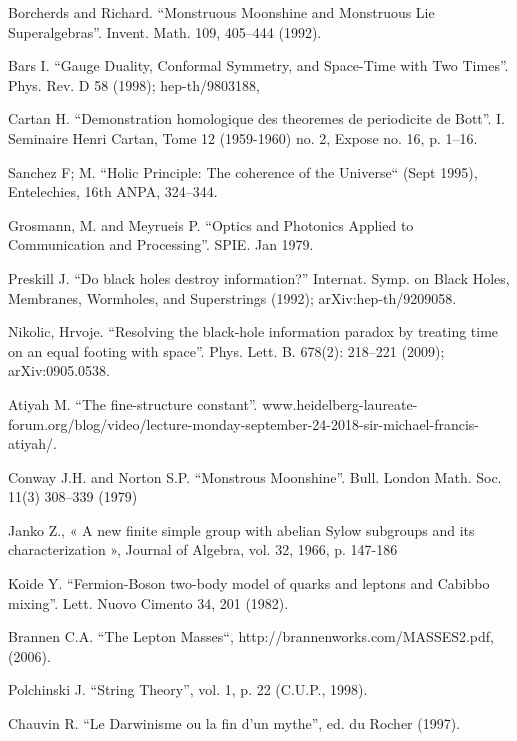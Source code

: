 \documentclass[twoside,draft]{article}
\begin{document}
\begin{sloppypar}
\begin{thebibliography}{99}
 Borcherds and Richard. ``Monstruous Moonshine and Monstruous Lie
Superalgebras''. Invent. Math. 109, 405--444 (1992).

 Bars I. ``Gauge Duality, Conformal Symmetry, and Space-Time with
Two Times''. Phys. Rev. D 58 (1998); hep-th/9803188, 

 Cartan H. ``Demonstration homologique des theoremes de periodicite
de Bott''. I. Seminaire Henri Cartan, Tome 12 (1959-1960) no. 2, Expose no. 16,
p. 1--16.

 Sanchez F; M. ``Holic Principle: The coherence of the Universe`` (Sept 1995), Entelechies, 16th ANPA, 324--344.

 Grosmann, M. and Meyrueis P. ``Optics and Photonics Applied to Communication and Processing''. SPIE.  Jan 1979.

 Preskill J. ``Do black holes destroy information?'' Internat.
Symp. on Black Holes, Membranes, Wormholes, and Superstrings (1992);
arXiv:hep-th/9209058.

 Nikolic, Hrvoje. ``Resolving the black-hole information paradox by
treating time on an equal footing with space''. Phys. Lett. B. 678(2):
218--221 (2009); arXiv:0905.0538.

 Atiyah M. ``The fine-structure constant''. www.heidelberg-laureate-forum.org/blog/video/lecture-monday-september-24-2018-sir-michael-francis-atiyah/.

 Conway J.H. and Norton S.P. ``Monstrous Moonshine''. Bull. London
Math. Soc. 11(3) 308--339 (1979)


 Janko Z., « A new finite simple group with abelian Sylow subgroups and its characterization », Journal of Algebra, vol. 32, 1966, p. 147-186

 Koide Y. ``Fermion-Boson two-body model of quarks and leptons and
Cabibbo mixing''.  Lett. Nuovo Cimento 34, 201 (1982).

 Brannen C.A. ``The Lepton Masses``, http://brannenworks.com/MASSES2.pdf, (2006).

 Polchinski J. ``String Theory'', vol. 1, p. 22 (C.U.P., 1998).

 Chauvin R. ``Le Darwinisme ou la fin d'un mythe'', ed. du Rocher
(1997).


\end{thebibliography}
\end{sloppypar}
\end{document}
